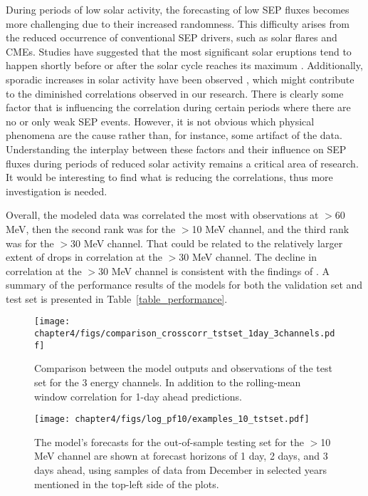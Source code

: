 During periods of low solar activity, the forecasting of low SEP fluxes becomes more challenging due to their increased randomness. This difficulty arises from the reduced occurrence of conventional SEP drivers, such as solar flares and CMEs. Studies have suggested that the most significant solar eruptions tend to happen shortly before or after the solar cycle reaches its maximum \citep{vsvestka_1995}. Additionally, sporadic increases in solar activity have been observed \citep{kane_2011}, which might contribute to the diminished correlations observed in our research.
There is clearly some factor that is influencing the correlation during certain periods where there are no or only weak SEP events. However, it is not obvious which physical phenomena are the cause rather than, for instance, some artifact of the data. Understanding the interplay between these factors and their influence on SEP fluxes during periods of reduced solar activity remains a critical area of research. It would be interesting to find what is reducing the correlations, thus more investigation is needed.

Overall, the modeled data was correlated the most with observations at $>$60 MeV, then the second rank was for the $>$10 MeV channel, and the third rank was for the $>$30 MeV channel. That could be related to the relatively larger extent of drops in correlation at the $>$30 MeV channel.
The decline in correlation at the $>$30 MeV channel is consistent with the findings of \citet{le_2017}.
A summary of the performance results of the models for both the validation set and test set is presented in Table~\ref{table_performance}.

\begin{figure}[h!]
    \centerline{\texttt{[image: chapter4/figs/comparison\_crosscorr\_tstset\_1day\_3channels.pdf]}}
    \caption{Comparison between the model outputs and observations of the test set for the 3 energy channels. In addition to the rolling-mean window correlation for 1-day ahead predictions.}
\label{fig_crosscorr_tstset}
\end{figure}

\begin{figure}[htp]
    \centerline{\texttt{[image: chapter4/figs/log\_pf10/examples\_10\_tstset.pdf]}}
    \caption{The model's forecasts for the out-of-sample testing set for the $>$10 MeV channel are shown at forecast horizons of 1 day, 2 days, and 3 days ahead, using samples of data from December in selected years mentioned in the top-left side of the plots.}
\label{fig_examples_pf10_tstset}
\end{figure}

